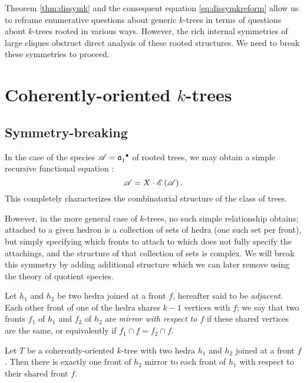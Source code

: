 \documentclass[distribution,draft]{brandiss} %
\numberwithin{section}{chapter}
\numberwithin{figure}{chapter}
\begin{document}
Theorem \ref{thm:dissymk} and the consequent equation \eqref{eq:dissymkreform} allow us to reframe enumerative questions about generic $k$-trees in terms of questions about $k$-trees rooted in various ways.
However, the rich internal symmetries of large cliques obstruct direct analysis of these rooted structures.
We need to break these symmetries to proceed.

\section{Coherently-oriented $k$-trees}
\subsection{Symmetry-breaking}\label{ss:symbreak}
In the case of the species $\mathscr{A} =  {\mathfrak{a}_{1}^{}}^{\bullet } $ of rooted trees, we may obtain a simple recursive functional equation \cite[\S 1, eq.~(9)]{bll:species}:
\begin{equation}
  \label{eq:rtrees}
  \mathscr{A} = X \cdot \mathscr{E} \left( {\mathscr{A}} \right).
\end{equation}
This completely characterizes the combinatorial structure of the class of trees.

However, in the more general case of $k$-trees, no such simple relationship obtains; attached to a given hedron is a collection of sets of hedra (one such set per front), but simply specifying which fronts to attach to which does not fully specify the attachings, and the structure of that collection of sets is complex.
We will break this symmetry by adding additional structure which we can later remove using the theory of quotient species.

\begin{definition}
  \label{def:mirrorfronts}
  Let $h_{1}$ and $h_{2}$ be two hedra joined at a front $f$, hereafter said to be \emph{adjacent}.
  Each other front of one of the hedra shares $k-1$ vertices with $f$; we say that two fronts $f_{1}$ of $h_{1}$ and $f_{2}$ of $h_{2}$ are \emph{mirror with respect to $f$} if these shared vertices are the same, or equivalently if $f_{1} \cap f = f_{2} \cap f$.
\end{definition}

\begin{observation}
  \label{obs:mirrorfronts}
  Let $T$ be a coherently-oriented $k$-tree with two hedra $h_{1}$ and $h_{2}$ joined at a front $f$.
  Then there is exactly one front of $h_{2}$ mirror to each front of $h_{1}$ with respect to their shared front $f$.
\end{observation}
\end{document}
